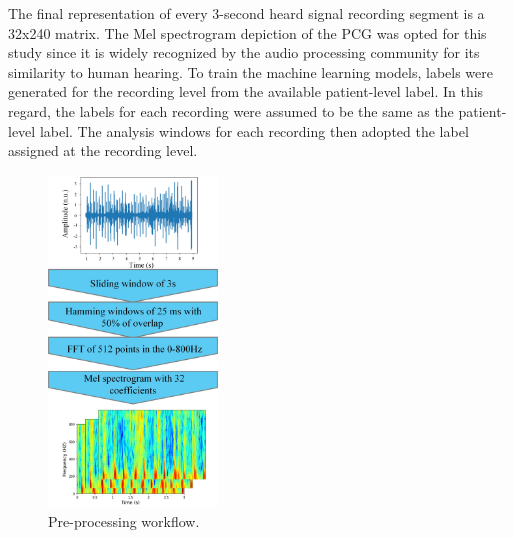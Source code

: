 \documentclass{article}
\begin{document}
\par The final representation of every 3-second heard signal recording segment is a 32x240 matrix. The Mel spectrogram depiction of the PCG was opted for this study since it is widely recognized by the audio processing community for its similarity to human hearing. To train the machine learning models, labels were generated for the recording level from the available patient-level label. In this regard, the labels for each recording were assumed to be the same as the patient-level label. The analysis windows for each recording then adopted the label assigned at the recording level.


\begin{figure}
\centering
    \includegraphics[width=0.4\textwidth]{Documents/preprecessing.jpg}
    \caption{Pre-processing workflow.}
    \label{fig:PP}

\end{figure}
\end{document}
